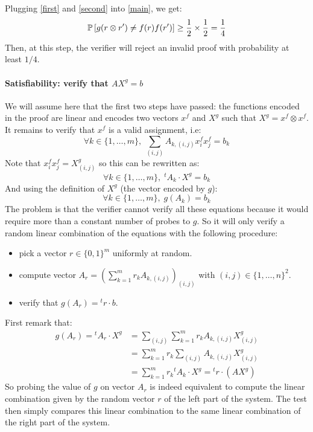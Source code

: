Plugging \eqref{first} and \eqref{second} into \eqref{main}, we get:
\begin{displaymath}
\mathbb{P}\left[g(r\otimes r')\neq f(r)f(r')\right]\geq\frac{1}{2}\times\frac{1}{2}=\frac{1}{4}
\end{displaymath}
Then, at this step, the verifier will reject an invalid proof with probability
at least $1/4$.


\paragraph{Satisfiability: verify that $AX^g = b$}
We will assume here that the first two steps have passed: the functions
encoded in the proof are linear and encodes two vectors $x^f$ and $X^g$ such
that $X^g = x^f\otimes x^f$. It remains to verify that $x^f$ is a valid
assignment, i.e:
\begin{displaymath}
\forall k\in\{1,\ldots,m\},\;\sum_{(i,j)} A_{k,(i,j)}x^f_ix^f_j=b_k
\end{displaymath}
Note that $x^f_ix^f_j= X^g_{(i,j)}$ so this can be rewritten as:
\begin{displaymath}
\forall k\in\{1,\ldots,m\},\; {}^tA_k\cdot X^g = b_k
\end{displaymath}
And using the definition of $X^g$ (the vector encoded by $g$):
\begin{displaymath}
\forall k\in\{1,\ldots,m\},\; g(A_k) = b_k
\end{displaymath}
The problem is that the verifier cannot verify all these equations because it
would require more than a constant number of probes to $g$. So it will only
verify a random linear combination of the equations with the following
procedure:
\begin{itemize}
\item pick a vector $r\in\{0,1\}^m$ uniformly at random.
\item compute vector $A_r = \left(\sum_{k=1}^m r_kA_{k,(i,j)}\right)_{(i,j)}$
with $(i,j)\in\{1,\ldots,n\}^2$.
\item verify that $g(A_r) = {}^tr\cdot b$.
\end{itemize}

First remark that:
\begin{equation}\label{end}
\begin{split}
g(A_r) =
{}^tA_r\cdot X^g &= \sum_{(i,j)}\sum_{k=1}^m r_kA_{k,(i,j)}X^g_{(i,j)}\\
&= \sum_{k=1}^m r_k \sum_{(i,j)}A_{k,(i,j)}X^g_{(i,j)}\\
&= \sum_{k=1}^m r_k {}^tA_k\cdot X^g = {}^tr\cdot (AX^g)
\end{split}
\end{equation}
So probing the value of $g$ on vector $A_r$ is indeed equivalent to compute the
linear combination given by the random vector $r$ of the left part of the
system. The test then simply compares this linear combination to the same
linear combination of the right part of the system.


